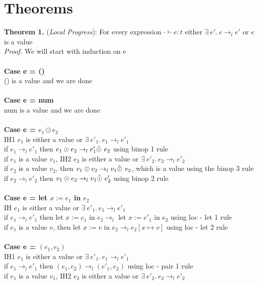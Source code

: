 \documentclass{article}
\begin{document}
\section{Theorems}
\textbf{Theorem 1.} (\textit{Local Progress}): For every expression $\cdot \vdash e : t$ either $  \exists \ e'.\ e \to_l e'$  or $e$ is a value
  \\
\textit{Proof.} We will start with induction on e \\\\
\textbf{Case e = ()} \\
() is a value and we are done \\ \\
\textbf{Case e = num} \\
num is a value and we are done \\ \\
\textbf{Case e = $e_1 \odot e_2$} \\
IH1 $e_1$ is either a value or $  \exists \ e'_1.\ e_1 \to_l e'_1 $ \\
if $e_1 \to_l e'_1$ then $e_1 \odot e_2 \to_l e'_1 \Tilde{\odot} \ e_2$ using binop 1 rule\\
if $e_1$ is a value $v_1$, IH2 $e_2$ is either a value or $  \exists \ e'_2.\ e_2 \to_l e'_2 $ \\
if $e_2$ is a value $v_2$, then $v_1 \odot v_2 \to_l v_1 \Tilde{\odot} \ v_2$, which is a value using the binop 3 rule  \\
if $e_2 \to_l e'_2$ then $v_1 \odot e_2 \to_l v_1 \Tilde{\odot} \ e'_2$ using binop 2 rule 
\\ \\
\textbf{Case e = let $x := e_1$ in $e_2$} \\
IH $e_1$ is either a value or $  \exists \ e'_1.\ e_1 \to_l e'_1 $ \\
if $e_1 \to_l e'_1$ then let $x := e_1$ in $e_2 \to_l $ let $x := e'_1$ in $e_2$ using loc - let 1 rule\\
if $e_1$ is a value $v$, then let $x := v$ in $e_2 \to_l e_2[x \mapsto v]$ using loc - let 2 rule
\\ \\
\textbf{Case e = $(e_1,e_2)$} \\
IH1 $e_1$ is either a value or $  \exists \ e'_1.\ e_1 \to_l e'_1 $ \\
if $e_1 \to_l e'_1$ then $(e_1,e_2) \to_l (e'_1, e_2)$ using loc - pair 1 rule\\
if $e_1$ is a value $v_1$, IH2 $e_2$ is either a value or $  \exists \ e'_2.\ e_2 \to_l e'_2 $ \\
\end{document}
